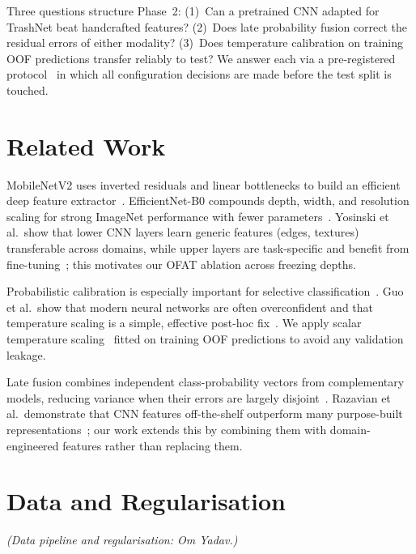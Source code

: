 \documentclass[conference]{IEEEtran}
\begin{document}
Three questions structure Phase~2: (1)~Can a pretrained CNN adapted for TrashNet beat handcrafted features? (2)~Does late probability fusion correct the residual errors of either modality? (3)~Does temperature calibration on training OOF predictions transfer reliably to test? We answer each via a pre-registered protocol~\cite{elyaniv2010selective} in which all configuration decisions are made before the test split is touched.

\section{Related Work}
\label{sec:related}
MobileNetV2 uses inverted residuals and linear bottlenecks to build an efficient deep feature extractor~\cite{sandler2018mobilenetv2}. EfficientNet-B0 compounds depth, width, and resolution scaling for strong ImageNet performance with fewer parameters~\cite{tan2019efficientnet}. Yosinski et al.\ show that lower CNN layers learn generic features (edges, textures) transferable across domains, while upper layers are task-specific and benefit from fine-tuning~\cite{yosinski2014transferable}; this motivates our OFAT ablation across freezing depths.

Probabilistic calibration is especially important for selective classification~\cite{niculescu2005predicting}. Guo et al.\ show that modern neural networks are often overconfident and that temperature scaling is a simple, effective post-hoc fix~\cite{guo2017calibration}. We apply scalar temperature scaling~\cite{guo2017calibration} fitted on training OOF predictions to avoid any validation leakage.

Late fusion combines independent class-probability vectors from complementary models, reducing variance when their errors are largely disjoint~\cite{wolpert1992stacked}. Razavian et al.\ demonstrate that CNN features off-the-shelf outperform many purpose-built representations~\cite{razavian2014cnn}; our work extends this by combining them with domain-engineered features rather than replacing them.

\section{Data and Regularisation}
\label{sec:data}
\textit{(Data pipeline and regularisation: Om Yadav.)}
\end{document}
